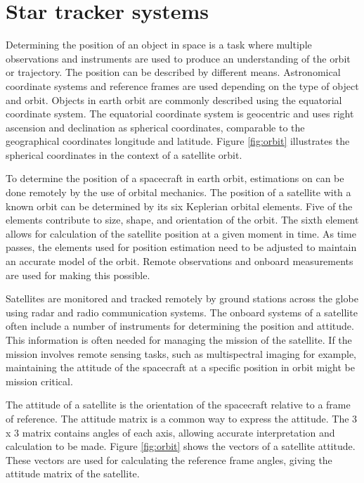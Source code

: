 \documentclass[12pt]{report}
\begin{document}
\chapter{Star tracker systems}
Determining the position of an object in space is a task where multiple observations and instruments are used to produce an understanding of the orbit or trajectory. The position can be described by different means. Astronomical coordinate systems and reference frames are used depending on the type of object and orbit. Objects in earth orbit are commonly described using the equatorial coordinate system. The equatorial coordinate system is geocentric and uses right ascension and declination as spherical coordinates, comparable to the geographical coordinates longitude and latitude. Figure \ref*{fig:orbit} illustrates the spherical coordinates in the context of a satellite orbit. \citep{SatDesgin}
\par
To determine the position of a spacecraft in earth orbit, estimations on can be done remotely by the use of orbital mechanics. The position of a satellite with a known orbit can be determined by its six Keplerian orbital elements. Five of the elements contribute to size, shape, and orientation of the orbit. The sixth element allows for calculation of the satellite position at a given moment in time. As time passes, the elements used for position estimation need to be adjusted to maintain an accurate model of the orbit. Remote observations and onboard measurements are used for making this possible. \citep{SatDesgin}
\par
Satellites are monitored and tracked remotely by ground stations across the globe using radar and radio communication systems. The onboard systems of a satellite often include a number of instruments for determining the position and attitude. This information is often needed for managing the mission of the satellite. If the mission involves remote sensing tasks, such as multispectral imaging for example, maintaining the attitude of the spacecraft at a specific position in orbit might be mission critical.  
\par
The attitude of a satellite is the orientation of the spacecraft relative to a frame of reference. The attitude matrix is a common way to express the attitude. The 3 x 3 matrix contains angles of each axis, allowing accurate interpretation and calculation to be made. Figure \ref*{fig:orbit} shows the vectors of a satellite attitude. These vectors are used for calculating the reference frame angles, giving the attitude matrix of the satellite. \citep*{StRef}
\par
\end{document}
